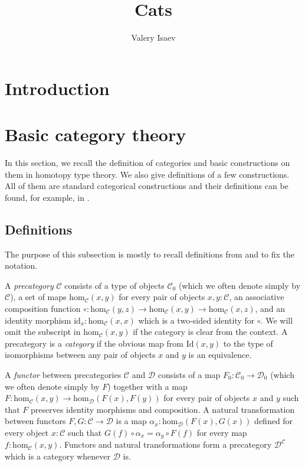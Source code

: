 \documentclass[reqno]{amsart}
\theoremstyle{definition}
\theoremstyle{remark}
\newcommand{\fs}[1]{\mathrm{#1}}
\newcommand{\scat}[1]{\mathcal{#1}}
\renewcommand{\hom}{\fs{hom}}
\newcommand{\id}{\fs{id}}
\newcommand{\Id}{\fs{Id}}
\newcommand{\ob}[1]{#1_0}
\newcommand{\fob}[1]{#1_0}
\numberwithin{figure}{section}
\begin{document}
\title{Cats}

\author{Valery Isaev}

\begin{abstract}
\end{abstract}

\maketitle

\section{Introduction}


\section{Basic category theory}

In this section, we recall the definition of categories and basic constructions on them in homotopy type theory.
We also give definitions of a few constructions.
All of them are standard categorical constructions and their definitions can be found, for example, in \cite{maclane}.

\subsection{Definitions}

The purpose of this subsection is mostly to recall definitions from \cite{univalent-cats} and to fix the notation.

A \emph{precategory} $\scat{C}$ consists of a type of objects $\ob{\scat{C}}$ (which we often denote simply by $\scat{C}$), a set of maps $\hom_\scat{C}(x,y)$ for every pair of objects $x,y : \scat{C}$,
an associative composition function $\circ : \hom_\scat{C}(y,z) \to \hom_\scat{C}(x,y) \to \hom_\scat{C}(x,z)$, and an identity morphism $\id_x : \hom_\scat{C}(x,x)$ which is a two-sided identity for $\circ$.
We will omit the subscript in $\hom_\scat{C}(x,y)$ if the category is clear from the context.
A precategory is a \emph{category} if the obvious map from $\Id(x,y)$ to the type of isomorphisms between any pair of objects $x$ and $y$ is an equivalence.

A \emph{functor} between precategories $\scat{C}$ and $\scat{D}$ consists of a map $\fob{F} : \ob{\scat{C}} \to \ob{\scat{D}}$ (which we often denote simply by $F$)
together with a map $F : \hom_\scat{C}(x,y) \to \hom_\scat{D}(F(x),F(y))$ for every pair of objects $x$ and $y$ such that $F$ preserves identity morphisms and composition.
A natural transformation between functors $F,G : \scat{C} \to \scat{D}$ is a map $\alpha_x : \hom_\scat{D}(F(x),G(x))$ defined for every object $x : \scat{C}$ such that $G(f) \circ \alpha_x = \alpha_y \circ F(f)$ for every map $f : \hom_\scat{C}(x,y)$.
Functors and natural transformations form a precategory $\scat{D}^\scat{C}$ which is a category whenever $\scat{D}$ is.
\end{document}

